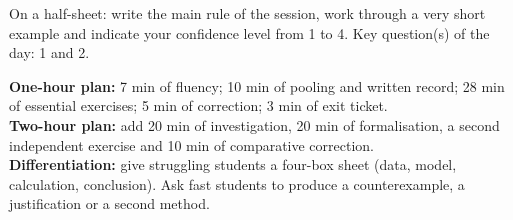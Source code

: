 \begin{exitticket}[3 minutes]On a half-sheet: write the main rule of the session, work through a very short example and indicate your confidence level from 1 to 4. Key question(s) of the day: 1 and 2.\end{exitticket}

\ifmxteacher
\begin{method}
\textbf{One-hour plan:} 7 min of fluency; 10 min of pooling and written record; 28 min of essential exercises; 5 min of correction; 3 min of exit ticket.\\
\textbf{Two-hour plan:} add 20 min of investigation, 20 min of formalisation, a second independent exercise and 10 min of comparative correction.\\
\textbf{Differentiation:} give struggling students a four-box sheet (data, model, calculation, conclusion). Ask fast students to produce a counterexample, a justification or a second method.
\end{method}
\fi
